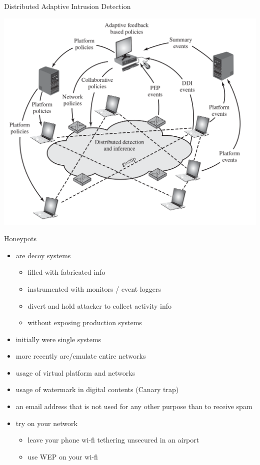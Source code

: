 \documentclass{beamer}
\begin{document}
\begin{frame}{Distributed Adaptive Intrusion Detection}
   \begin{center}
    \includegraphics[width=0.6\linewidth]{dist}
  \end{center}
\end{frame}


\begin{frame}{Honeypots}
  \begin{itemize}
  \item are decoy systems 
    \begin{itemize}
    \item filled with fabricated info 
    \item instrumented with monitors / event loggers 
    \item divert and hold attacker to collect activity info 
    \item without exposing production systems 
    \end{itemize}
  \item initially were single systems 
  \item<2-> more recently are/emulate entire networks
  \item<2-> usage of virtual platform and networks
  \item<3-> usage of watermark in digital contents (Canary trap)
  \item<3-> an email address that is not used for any other purpose than
    to receive spam
  \item<4-> try on your network
    \begin{itemize}
      \item leave your phone wi-fi tethering unsecured in an airport
      \item use WEP on your wi-fi
    \end{itemize}
  \end{itemize}
\end{frame}
\end{document}
